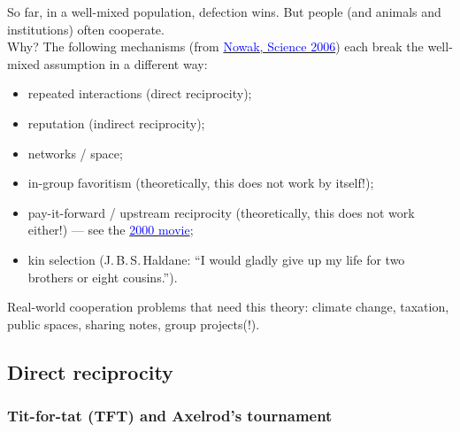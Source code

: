 \documentclass[20pt]{extarticle}
\newcommand{\hrefc}[2]{\href{#1}{\textcolor{blue}{#2}}}
\begin{document}
So far, in a well-mixed population, defection wins. But people (and animals and institutions) often cooperate.\\
Why? The following mechanisms (from \hrefc{https://www.doi.org/10.1126/science.1133755}{Nowak, Science 2006}) each break the well-mixed assumption in a different way:
\begin{itemize}
\item repeated interactions (direct reciprocity);
\item reputation (indirect reciprocity);
\item networks / space;
\item in-group favoritism (theoretically, this does not work by itself!);
\item pay-it-forward / upstream reciprocity (theoretically, this does not work either!) — see the \hrefc{https://en.wikipedia.org/wiki/Pay_It_Forward_(film)}{2000 movie};
\item kin selection (J.\,B.\,S.\,Haldane: ``I would gladly give up my life for two brothers or eight cousins.'').
\end{itemize}

Real-world cooperation problems that need this theory: climate change, taxation, public spaces, sharing notes, group projects(!).

\subsection*{Direct reciprocity}

\subsubsection*{Tit-for-tat (TFT) and Axelrod's tournament}
\end{document}
